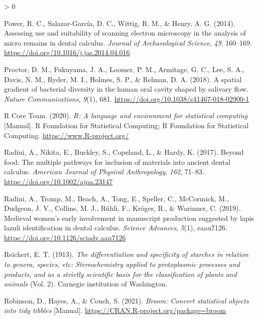 \documentclass[
]{article}
\newlength{\cslhangindent}
\newenvironment{CSLReferences}[2] %
 {%
  \setlength{\parindent}{0pt}
  \ifodd #1 \everypar{\setlength{\hangindent}{\cslhangindent}}\ignorespaces\fi
  \ifnum #2 > 0
  \setlength{\parskip}{#2\baselineskip}
  \fi
 }%
 {}
\begin{document}
\begin{CSLReferences}{1}{0}
\leavevmode\hypertarget{ref-powerSEMCalculus2014}{}%
Power, R. C., Salazar-García, D. C., Wittig, R. M., \& Henry, A. G. (2014). Assessing use and suitability of scanning electron microscopy in the analysis of micro remains in dental calculus. \emph{Journal of Archaeological Science}, \emph{49}, 160--169. \url{https://doi.org/10.1016/j.jas.2014.04.016}

\leavevmode\hypertarget{ref-proctorSpatialGradient2018}{}%
Proctor, D. M., Fukuyama, J. A., Loomer, P. M., Armitage, G. C., Lee, S. A., Davis, N. M., Ryder, M. I., Holmes, S. P., \& Relman, D. A. (2018). A spatial gradient of bacterial diversity in the human oral cavity shaped by salivary flow. \emph{Nature Communications}, \emph{9}(1), 681. \url{https://doi.org/10.1038/s41467-018-02900-1}

\leavevmode\hypertarget{ref-R-base}{}%
R Core Team. (2020). \emph{R: {A} language and environment for statistical computing} {[}Manual{]}. {R Foundation for Statistical Computing}; {R Foundation for Statistical Computing}. \url{https://www.R-project.org/}

\leavevmode\hypertarget{ref-radiniFoodMultiplePathways2017}{}%
Radini, A., Nikita, E., Buckley, S., Copeland, L., \& Hardy, K. (2017). Beyond food: {The} multiple pathways for inclusion of materials into ancient dental calculus. \emph{American Journal of Physical Anthropology}, \emph{162}, 71--83. \url{https://doi.org/10.1002/ajpa.23147}

\leavevmode\hypertarget{ref-radiniMedievalWomenEarly2019}{}%
Radini, A., Tromp, M., Beach, A., Tong, E., Speller, C., McCormick, M., Dudgeon, J. V., Collins, M. J., Rühli, F., Kröger, R., \& Warinner, C. (2019). Medieval women's early involvement in manuscript production suggested by lapis lazuli identification in dental calculus. \emph{Science Advances}, \emph{5}(1), eaau7126. \url{https://doi.org/10.1126/sciadv.aau7126}

\leavevmode\hypertarget{ref-reichertStarchBible1913b}{}%
Reichert, E. T. (1913). \emph{The differentiation and specificity of starches in relation to genera, species, etc: Stereochemistry applied to protoplasmic processes and products, and as a strictly scientific basis for the classification of plants and animals} (Vol. 2). {Carnegie institution of Washington}.

\leavevmode\hypertarget{ref-R-broom}{}%
Robinson, D., Hayes, A., \& Couch, S. (2021). \emph{Broom: {Convert} statistical objects into tidy tibbles} {[}Manual{]}. \url{https://CRAN.R-project.org/package=broom}


\end{CSLReferences}
\end{document}
